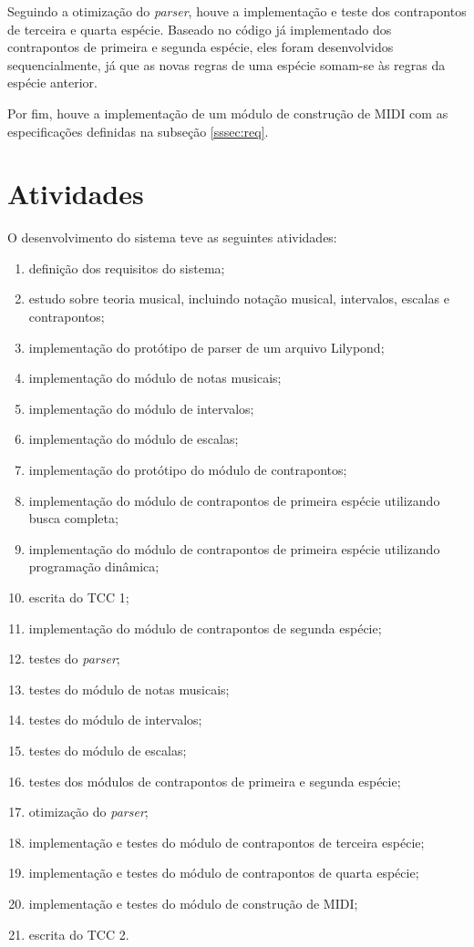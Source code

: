     Seguindo a otimização do \textit{parser}, houve a implementação e teste dos contrapontos de terceira e quarta espécie. Baseado no código já implementado dos contrapontos de primeira e segunda espécie, eles foram desenvolvidos sequencialmente, já que as novas regras de uma espécie somam-se às regras da espécie anterior.

    Por fim, houve a implementação de um módulo de construção de MIDI com as especificações definidas na subseção \ref{sssec:req}.

  \section[Atividades]{Atividades}

  O desenvolvimento do sistema teve as seguintes atividades:

  \begin{enumerate}
    \item \label{t1} definição dos requisitos do sistema;
    \item \label{t2} estudo sobre teoria musical, incluindo notação musical, intervalos, escalas e contrapontos;
    \item \label{t3} implementação do protótipo de parser de um arquivo Lilypond;
    \item \label{t4} implementação do módulo de notas musicais;
    \item \label{t5} implementação do módulo de intervalos;
    \item \label{t6} implementação do módulo de escalas;
    \item \label{t7} implementação do protótipo do módulo de contrapontos;
    \item \label{t8} implementação do módulo de contrapontos de primeira espécie utilizando busca completa;
    \item \label{t9} implementação do módulo de contrapontos de primeira espécie utilizando programação dinâmica;
    \item \label{t10} escrita do TCC 1;
    \item \label{t11} implementação do módulo de contrapontos de segunda espécie;
    \item \label{t12} testes do \textit{parser};
    \item \label{t13} testes do módulo de notas musicais;
    \item \label{t14} testes do módulo de intervalos;
    \item \label{t15} testes do módulo de escalas;
    \item \label{t16} testes dos módulos de contrapontos de primeira e segunda espécie;
    \item \label{t17} otimização do \textit{parser};
    \item \label{t18} implementação e testes do módulo de contrapontos de terceira espécie;
    \item \label{t19} implementação e testes do módulo de contrapontos de quarta espécie;
    \item \label{t20} implementação e testes do módulo de construção de MIDI;
    \item \label{t21} escrita do TCC 2.
  \end{enumerate}

